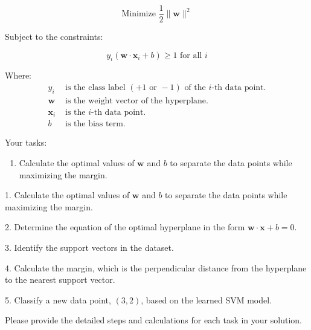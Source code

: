 \documentclass[]{article}
\begin{document}
	\[
	\text{Minimize } \frac{1}{2}\|\mathbf{w}\|^2
	\]
	
	Subject to the constraints:
	
	\[
	y_i(\mathbf{w}\cdot\mathbf{x}_i + b) \geq 1 \text{ for all } i
	\]
	
	Where:
	\begin{align*}
		y_i & \text{ is the class label } (+1 \text{ or } -1) \text{ of the } i\text{-th data point.} \\
		\mathbf{w} & \text{ is the weight vector of the hyperplane.} \\
		\mathbf{x}_i & \text{ is the } i\text{-th data point.} \\
		b & \text{ is the bias term.}
	\end{align*}
	
	Your tasks:
	\begin{enumerate}
		\item Calculate the optimal values of \(\mathbf{w}\) and \(b\) to separate the data points while maximizing the margin.
		
	\end{enumerate}
	
	1. Calculate the optimal values of \(\mathbf{w}\) and \(b\) to separate the data points while maximizing the margin.
	
	2. Determine the equation of the optimal hyperplane in the form \(\mathbf{w}\cdot\mathbf{x} + b = 0\).
	
	3. Identify the support vectors in the dataset.
	
	4. Calculate the margin, which is the perpendicular distance from the hyperplane to the nearest support vector.
	
	5. Classify a new data point, \((3, 2)\), based on the learned SVM model.
	
	Please provide the detailed steps and calculations for each task in your solution.
	
	
\end{document}
